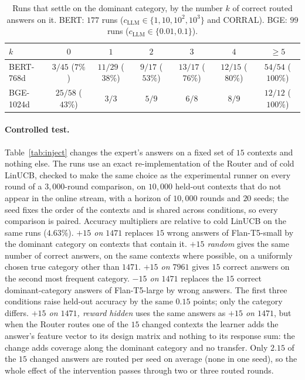 \documentclass[anon]{alt2027} %
\begin{document}
\begin{table}[h]
\centering
\caption{Runs that settle on the dominant category, by the number $k$ of
correct routed answers on it. BERT: $177$ runs ($c_{\mathrm{LLM}}\in\{1,10,10^2,10^3\}$ and
CORRAL). BGE: $99$ runs ($c_{\mathrm{LLM}}\in\{0.01,0.1\}$).}
\label{tab:dose}
\small
\begin{tabular}{@{}lcccccc@{}}
\toprule
$k$ & $0$ & $1$ & $2$ & $3$ & $4$ & $\ge5$ \\
\midrule
BERT-768d & $3/45$ ($7\%$) & $11/29$ ($38\%$) & $9/17$ ($53\%$) & $13/17$ ($76\%$) & $12/15$ ($80\%$) & $54/54$ ($100\%$) \\
BGE-1024d & $25/58$ ($43\%$) & $3/3$ & $5/9$ & $6/8$ & $8/9$ & $12/12$ ($100\%$) \\
\bottomrule
\end{tabular}
\end{table}

\paragraph{Controlled test.}
Table~\ref{tab:inject} changes the expert's answers on a fixed set of $15$
contexts and nothing else. The runs use an exact re-implementation of the
Router and of cold LinUCB, checked to make the same choice as the
experimental runner on every round of a $3{,}000$-round comparison, on
$10{,}000$ held-out contexts that do not appear in the online stream, with a
horizon of $10{,}000$ rounds and $20$ seeds; the seed fixes the order of the
contexts and is shared across conditions, so every comparison is paired.
Accuracy multipliers are relative to cold LinUCB on the same runs ($4.63\%$).
\emph{$+15$ on $1471$} replaces $15$ wrong answers of Flan-T5-small by the
dominant category on contexts that contain it. \emph{$+15$ random} gives the
same number of correct answers, on the same contexts where possible, on a
uniformly chosen true category other than $1471$. \emph{$+15$ on $7961$}
gives $15$ correct answers on the second most frequent category.
\emph{$-15$ on $1471$} replaces the $15$ correct dominant-category answers of
Flan-T5-large by wrong answers. The first three conditions raise held-out
accuracy by the same $0.15$ points; only the category differs.
\emph{$+15$ on $1471$, reward hidden} uses the same answers as \emph{$+15$ on
$1471$}, but when the Router routes one of the $15$ changed contexts the
learner adds the answer's feature vector to its design matrix and nothing to
its response sum: the change adds coverage along the dominant category and no
transfer. Only $2.15$ of the $15$ changed answers are routed per seed on
average (none in one seed), so the whole effect of the intervention passes
through two or three routed rounds.
\end{document}
